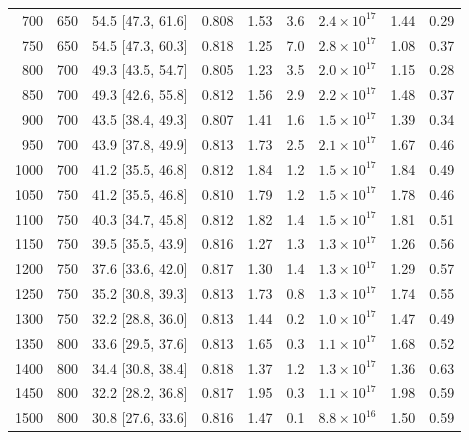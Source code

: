 \begin{longtable}{rrlrrrrrr}
700 & 650 & 54.5 [47.3, 61.6] & 0.808 & 1.53 & 3.6 & $2.4\times10^{17}$ & 1.44 & 0.29 \\
750 & 650 & 54.5 [47.3, 60.3] & 0.818 & 1.25 & 7.0 & $2.8\times10^{17}$ & 1.08 & 0.37 \\
800 & 700 & 49.3 [43.5, 54.7] & 0.805 & 1.23 & 3.5 & $2.0\times10^{17}$ & 1.15 & 0.28 \\
850 & 700 & 49.3 [42.6, 55.8] & 0.812 & 1.56 & 2.9 & $2.2\times10^{17}$ & 1.48 & 0.37 \\
900 & 700 & 43.5 [38.4, 49.3] & 0.807 & 1.41 & 1.6 & $1.5\times10^{17}$ & 1.39 & 0.34 \\
950 & 700 & 43.9 [37.8, 49.9] & 0.813 & 1.73 & 2.5 & $2.1\times10^{17}$ & 1.67 & 0.46 \\
1000 & 700 & 41.2 [35.5, 46.8] & 0.812 & 1.84 & 1.2 & $1.5\times10^{17}$ & 1.84 & 0.49 \\
1050 & 750 & 41.2 [35.5, 46.8] & 0.810 & 1.79 & 1.2 & $1.5\times10^{17}$ & 1.78 & 0.46 \\
1100 & 750 & 40.3 [34.7, 45.8] & 0.812 & 1.82 & 1.4 & $1.5\times10^{17}$ & 1.81 & 0.51 \\
1150 & 750 & 39.5 [35.5, 43.9] & 0.816 & 1.27 & 1.3 & $1.3\times10^{17}$ & 1.26 & 0.56 \\
1200 & 750 & 37.6 [33.6, 42.0] & 0.817 & 1.30 & 1.4 & $1.3\times10^{17}$ & 1.29 & 0.57 \\
1250 & 750 & 35.2 [30.8, 39.3] & 0.813 & 1.73 & 0.8 & $1.3\times10^{17}$ & 1.74 & 0.55 \\
1300 & 750 & 32.2 [28.8, 36.0] & 0.813 & 1.44 & 0.2 & $1.0\times10^{17}$ & 1.47 & 0.49 \\
1350 & 800 & 33.6 [29.5, 37.6] & 0.813 & 1.65 & 0.3 & $1.1\times10^{17}$ & 1.68 & 0.52 \\
1400 & 800 & 34.4 [30.8, 38.4] & 0.818 & 1.37 & 1.2 & $1.3\times10^{17}$ & 1.36 & 0.63 \\
1450 & 800 & 32.2 [28.2, 36.8] & 0.817 & 1.95 & 0.3 & $1.1\times10^{17}$ & 1.98 & 0.59 \\
1500 & 800 & 30.8 [27.6, 33.6] & 0.816 & 1.47 & 0.1 & $8.8\times10^{16}$ & 1.50 & 0.59 \\
\bottomrule
\end{longtable}
